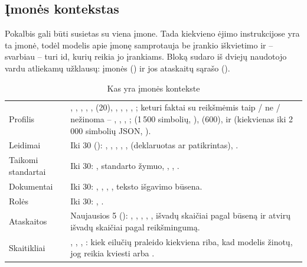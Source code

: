 \subsection{Įmonės kontekstas}\label{sec:chat:company}

Pokalbis gali būti susietas su viena įmone. Tada kiekvieno ėjimo instrukcijose yra ta įmonė,
todėl modelis apie įmonę samprotauja be įrankio iškvietimo ir -- svarbiau -- turi id, kurių
reikia jo įrankiams. Bloką sudaro  iš dviejų naudotojo vardu atliekamų
užklausų: įmonės () ir jos ataskaitų sąrašo
().

\begin{table}[H]
\caption{Kas yra įmonės kontekste}\label{tab:chat:company}
\begin{tabularx}{\textwidth}{@{}L{33mm}Y@{}}
\toprule
{} &  \\
\midrule
Profilis & , , , , ,  (20), , , , , ; keturi faktai su reikšmėmis taip / ne / nežinoma -- , , , ;  (1\,500 simbolių, ),  (600),  ir  (kiekvienas iki 2\,000 simbolių JSON, ). \\
Leidimai & Iki 30 (): , , , , ,  (deklaruotas ar patikrintas), . \\
Taikomi standartai & Iki 30: , standarto žymuo, , , . \\
Dokumentai & Iki 30: , , , , teksto išgavimo būsena. \\
Rolės & Iki 30: , . \\
Ataskaitos & Naujausios 5 (): , , , , , išvadų skaičiai pagal būseną ir atvirų išvadų skaičiai pagal reikšmingumą. \\
Skaitikliai & , , , : kiek eilučių praleido kiekviena riba, kad modelis žinotų, jog reikia kviesti  arba . \\
\bottomrule
\end{tabularx}
\end{table}

